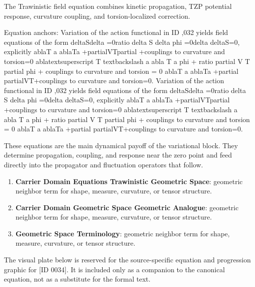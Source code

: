 The Trawinistic field equation combines kinetic propagation, TZP potential response, curvature coupling, and torsion-localized correction.

Equation anchors: Variation of the action functional in ID ,032 yields field equations of the form deltaSdelta =0ratio delta S delta phi =0delta deltaS=0, explicitly ablaT a ablaTa +partialVTpartial +couplings to curvature and torsion=0 ablatextsuperscript T textbackslash a abla T a phi + ratio partial V T partial phi + couplings to curvature and torsion = 0 ablaT a ablaTa +partial partialVT+couplings to curvature and torsion=0. Variation of the action functional in ID ,032 yields field equations of the form deltaSdelta =0ratio delta S delta phi =0delta deltaS=0, explicitly ablaT a ablaTa +partialVTpartial +couplings to curvature and torsion=0 ablatextsuperscript T textbackslash a abla T a phi + ratio partial V T partial phi + couplings to curvature and torsion = 0 ablaT a ablaTa +partial partialVT+couplings to curvature and torsion=0.

These equations are the main dynamical payoff of the variational block. They determine propagation, coupling, and response near the zero point and feed directly into the propagator and fluctuation operators that follow.
\endgroup

\begingroup\footnotesize\sloppy
\begin{enumerate}[leftmargin=1.35em,itemsep=1pt,topsep=1pt,parsep=0pt]
\item \textbf{Carrier Domain Equations Trawinistic Geometric Space}: geometric neighbor term for shape, measure, curvature, or tensor structure.
\item \textbf{Carrier Domain Geometric Space Geometric Analogue}: geometric neighbor term for shape, measure, curvature, or tensor structure.
\item \textbf{Geometric Space Terminology}: geometric neighbor term for shape, measure, curvature, or tensor structure.
\end{enumerate}
\endgroup

\begingroup\footnotesize\sloppy
The visual plate below is reserved for the source-specific equation and progression graphic for [ID 0034]. It is included only as a companion to the canonical equation, not as a substitute for the formal text.
\par\endgroup
\ifTZPDarkEdition
{}
\fi

